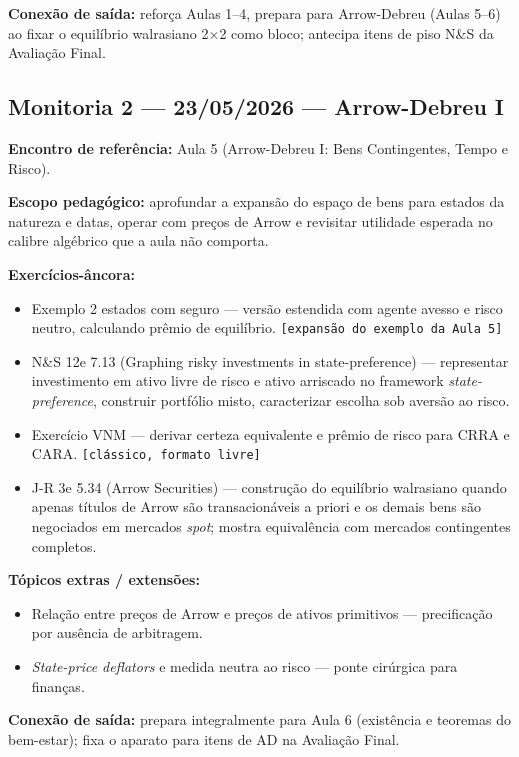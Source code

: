 \documentclass[11pt,a4paper]{article}
\newcommand{\ns}{N\&S 12e}
\newcommand{\jr}{J-R 3e}
\begin{document}
\textbf{Conexão de saída:} reforça Aulas 1--4, prepara para Arrow-Debreu (Aulas 5--6) ao fixar o equilíbrio walrasiano 2$\times$2 como bloco; antecipa itens de piso N\&S da Avaliação Final.

\subsection{Monitoria 2 --- 23/05/2026 --- Arrow-Debreu I}

\textbf{Encontro de referência:} Aula 5 (Arrow-Debreu I: Bens Contingentes, Tempo e Risco).

\textbf{Escopo pedagógico:} aprofundar a expansão do espaço de bens para estados da natureza e datas, operar com preços de Arrow e revisitar utilidade esperada no calibre algébrico que a aula não comporta.

\textbf{Exercícios-âncora:}
\begin{itemize}
  \item Exemplo 2 estados com seguro --- versão estendida com agente avesso e risco neutro, calculando prêmio de equilíbrio. \texttt{[expansão do exemplo da Aula 5]}
  \item \ns{} 7.13 (Graphing risky investments in state-preference) --- representar investimento em ativo livre de risco e ativo arriscado no framework \textit{state-preference}, construir portfólio misto, caracterizar escolha sob aversão ao risco.
  \item Exercício VNM --- derivar certeza equivalente e prêmio de risco para CRRA e CARA. \texttt{[clássico, formato livre]}
  \item \jr{} 5.34 (Arrow Securities) --- construção do equilíbrio walrasiano quando apenas títulos de Arrow são transacionáveis a priori e os demais bens são negociados em mercados \textit{spot}; mostra equivalência com mercados contingentes completos.
\end{itemize}

\textbf{Tópicos extras / extensões:}
\begin{itemize}
  \item Relação entre preços de Arrow e preços de ativos primitivos --- precificação por ausência de arbitragem.
  \item \textit{State-price deflators} e medida neutra ao risco --- ponte cirúrgica para finanças.
\end{itemize}

\textbf{Conexão de saída:} prepara integralmente para Aula 6 (existência e teoremas do bem-estar); fixa o aparato para itens de AD na Avaliação Final.
\end{document}

